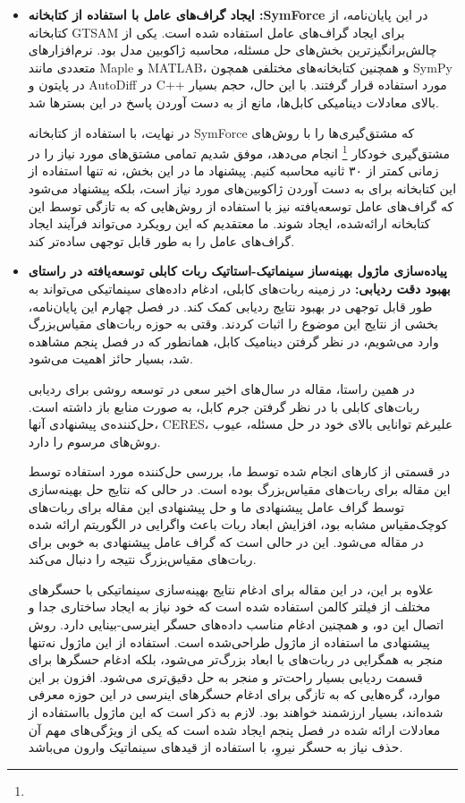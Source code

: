 \begin{itemize}
	
\item {\textbf{ایجاد گراف‌های عامل با استفاده از کتابخانه :SymForce} 
در این پایان‌نامه، از کتابخانه GTSAM برای ایجاد گراف‌های عامل استفاده شده است. یکی از چالش‌برانگیزترین بخش‌های حل مسئله، محاسبه ژاکوبین مدل بود. نرم‌افزارهای متعددی مانند Maple و MATLAB، و همچنین کتابخانه‌های مختلفی همچون SymPy در پایتون و AutoDiff در C++ مورد استفاده قرار گرفتند. با این حال، حجم بسیار بالای معادلات دینامیکی کابل‌ها، مانع از به دست آوردن پاسخ در این بسترها شد. 

در نهایت، با استفاده از کتابخانه SymForce که مشتق‌گیری‌ها را با روش‌های مشتق‌گیری خودکار
\footnote{} 
 انجام می‌دهد، موفق شدیم تمامی مشتق‌های مورد نیاز را در زمانی کمتر از ۳۰ ثانیه محاسبه کنیم. 
پیشنهاد ما در این بخش، نه تنها استفاده از این کتابخانه برای به دست آوردن ژاکوبین‌های مورد نیاز است، بلکه پیشنهاد می‌شود که گراف‌های عامل توسعه‌یافته نیز با استفاده از روش‌هایی که به تازگی توسط این کتابخانه ارائه‌شده، ایجاد شوند. ما معتقدیم که این رویکرد می‌تواند فرآیند ایجاد گراف‌های عامل را به طور قابل توجهی ساده‌تر کند.}



\item \textbf{پیاده‌سازی ماژول بهینه‌ساز سینماتیک-استاتیک ربات کابلی توسعه‌یافته در راستای بهبود دقت ردیابی:} 
در زمینه ربات‌های کابلی، ادغام داده‌های سینماتیکی می‌تواند به طور قابل توجهی در بهبود نتایج ردیابی کمک کند. در فصل چهارم این پایان‌نامه، بخشی از نتایج این موضوع را اثبات کردند. وقتی به حوزه ربات‌های مقیاس‌بزرگ وارد می‌شویم، در نظر گرفتن دینامیک کابل، همانطور که در فصل پنجم مشاهده شد، بسیار حائز اهمیت می‌شود. 

در همین راستا، مقاله \cite{allak2022kinematics} در سال‌های اخیر سعی در توسعه روشی برای ردیابی ربات‌های کابلی با در نظر گرفتن جرم کابل، به صورت منابع باز داشته است. حل‌کننده‌ی پیشنهادی آنها، CERES، علیرغم توانایی بالای خود در حل مسئله، عیوب روش‌های مرسوم را دارد. 

در قسمتی از کارهای انجام شده توسط ما، بررسی حل‌کننده مورد استفاده توسط این مقاله برای ربات‌های مقیاس‌بزرگ بوده است. در حالی که نتایج حل بهینه‌سازی توسط گراف عامل پیشنهادی ما و حل پیشنهادی این مقاله برای ربات‌های کوچک‌مقیاس مشابه بود، افزایش ابعاد ربات باعث واگرایی در الگوریتم ارائه شده در مقاله می‌شود. این در حالی است که گراف عامل پیشنهادی به خوبی برای ربات‌های مقیاس‌بزرگ نتیجه را دنبال می‌کند.

علاوه بر این، در این مقاله برای ادغام نتایج بهینه‌سازی سینماتیکی با حسگر‌های مختلف از فیلتر کالمن استفاده شده است که خود نیاز به ایجاد ساختاری جدا و اتصال این دو، و همچنین ادغام مناسب داده‌های حسگر اینرسی-بینایی دارد. روش پیشنهادی ما استفاده از ماژول طراحی‌شده است. استفاده از این ماژول نه‌تنها منجر به همگرایی در ربات‌های با ابعاد بزرگ‌تر می‌شود، بلکه ادغام حسگرها برای قسمت ردیابی بسیار راحت‌تر و منجر به حل دقیق‌تری می‌شود. افزون بر این موارد، گره‌هایی که به تازگی برای ادغام حسگرهای اینرسی در این حوزه معرفی شده‌اند، بسیار ارزشمند خواهند بود. لازم به ذکر است که این ماژول بااستفاده از معادلات ارائه شده در فصل پنجم ایجاد شده است که یکی از ویژگی‌های مهم آن حذف نیاز به حسگر نیروِ، با استفاده از قید‌های سینماتیک وارون می‌باشد. 


\end{itemize}
